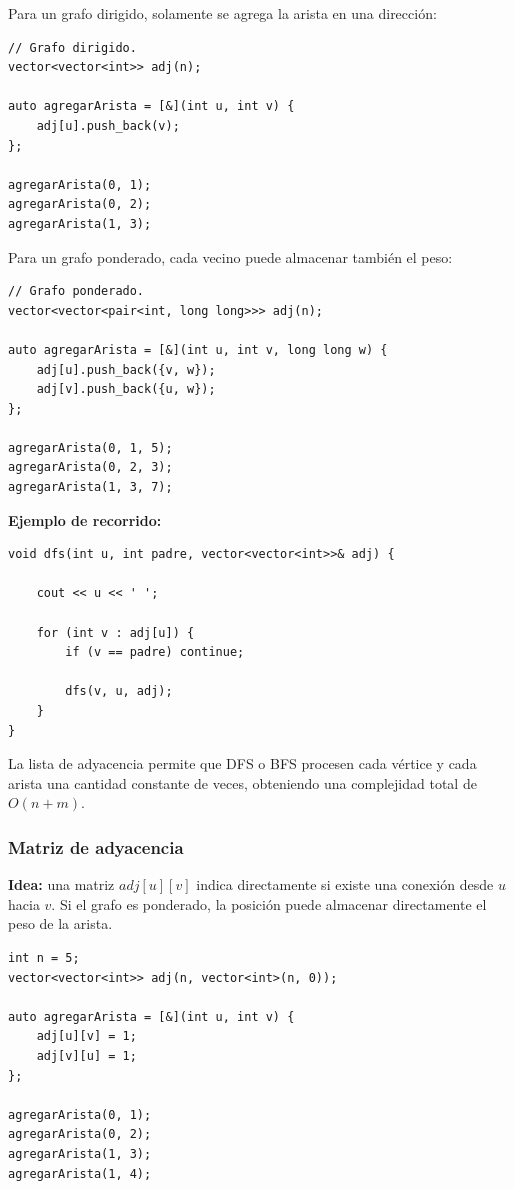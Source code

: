 \documentclass[10pt,a4paper,twocolumn]{article}
\begin{document}
Para un grafo dirigido, solamente se agrega la arista en una dirección:

\begin{lstlisting}[style=cpp]
// Grafo dirigido.
vector<vector<int>> adj(n);

auto agregarArista = [&](int u, int v) {
    adj[u].push_back(v);
};

agregarArista(0, 1);
agregarArista(0, 2);
agregarArista(1, 3);
\end{lstlisting}

Para un grafo ponderado, cada vecino puede almacenar también el peso:

\begin{lstlisting}[style=cpp]
// Grafo ponderado.
vector<vector<pair<int, long long>>> adj(n);

auto agregarArista = [&](int u, int v, long long w) {
    adj[u].push_back({v, w});
    adj[v].push_back({u, w});
};

agregarArista(0, 1, 5);
agregarArista(0, 2, 3);
agregarArista(1, 3, 7);
\end{lstlisting}

\textbf{Ejemplo de recorrido:}

\begin{lstlisting}[style=cpp]
void dfs(int u, int padre, vector<vector<int>>& adj) {

    cout << u << ' ';

    for (int v : adj[u]) {
        if (v == padre) continue;

        dfs(v, u, adj);
    }
}
\end{lstlisting}

La lista de adyacencia permite que DFS o BFS procesen cada vértice y
cada arista una cantidad constante de veces, obteniendo una
complejidad total de $O(n+m)$.

\subsubsection{Matriz de adyacencia}

\textbf{Idea:} una matriz $adj[u][v]$ indica directamente si existe
una conexión desde $u$ hacia $v$. Si el grafo es ponderado, la
posición puede almacenar directamente el peso de la arista.

\begin{lstlisting}[style=cpp]
int n = 5;
vector<vector<int>> adj(n, vector<int>(n, 0));

auto agregarArista = [&](int u, int v) {
    adj[u][v] = 1;
    adj[v][u] = 1;
};

agregarArista(0, 1);
agregarArista(0, 2);
agregarArista(1, 3);
agregarArista(1, 4);
\end{lstlisting}
\end{document}
